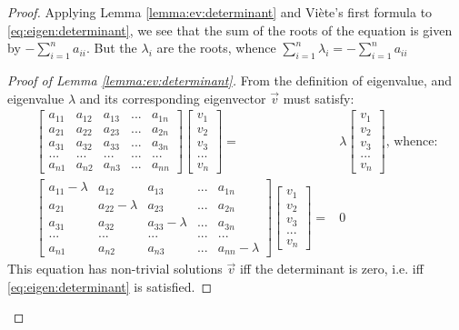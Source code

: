 \documentclass[]{article}
\begin{document}
\begin{appendices}
\begin{proof}
		Applying Lemma \ref{lemma:ev:determinant} and Vi\`ete's first formula\cite{enwiki:1030161470} to \eqref{eq:eigen:determinant}, we see that the sum of the roots of the equation is given by $-\sum_{i=1}^{n}a_{ii}$. But the $\lambda_i$ are the roots, whence $\sum_{i=1}^{n}\lambda_i=-\sum_{i=1}^{n}a_{ii}$
		\begin{proof}[Proof of Lemma \ref{lemma:ev:determinant}]
			From the definition of eigenvalue, and eigenvalue $\lambda$ and its corresponding eigenvector $\vec{v}$ must satisfy:
			\begin{align*}
			\begin{bmatrix}
			a_{11}&a_{12}&a_{13}&...&a_{1n}\\
			a_{21}&a_{22}&a_{23}&...&a_{2n}\\
			a_{31}&a_{32}&a_{33}&...&a_{3n}\\
			...&...&...&...&...\\
			a_{n1}&a_{n2}&a_{n3}&...&a_{nn}
			\end{bmatrix}\begin{bmatrix}
			v_1\\
			v_2\\
			v_3\\
			...\\
			v_n
			\end{bmatrix}=&\lambda \begin{bmatrix}
			v_1\\
			v_2\\
			v_3\\
			...\\
			v_n
			\end{bmatrix} \text{, whence:} \\
			\begin{bmatrix}
			a_{11}-\lambda&a_{12}&a_{13}&...&a_{1n}\\
			a_{21}&a_{22}-\lambda&a_{23}&...&a_{2n}\\
			a_{31}&a_{32}&a_{33}-\lambda&...&a_{3n}\\
			...&...&...&...&...\\
			a_{n1}&a_{n2}&a_{n3}&...&a_{nn}-\lambda
			\end{bmatrix}\begin{bmatrix}
			v_1\\
			v_2\\
			v_3\\
			...\\
			v_n
			\end{bmatrix}=&0
			\end{align*}
			This equation has non-trivial solutions $\vec{v}$ iff the determinant is zero, i.e. iff \eqref{eq:eigen:determinant} is satisfied.

\end{proof}
\end{proof}
\end{appendices}
\end{document}
